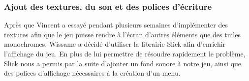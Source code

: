 \subsubsection{Ajout des textures, du son et des polices d'écriture}

Après que Vincent a essayé pendant plusieurs semaines d'implémenter des textures afin que le jeu puisse rendre à l'écran d'autres éléments que des tuiles monochromes, Wissame a décidé d'utiliser la librairie Slick afin d'enrichir l'affichage du jeu.
\ml
En plus de lui permettre de résoudre rapidement le problème, Slick nous a permis par la suite d'ajouter un fond sonore à notre jeu, ainsi que des polices d'affichage nécessaires à la création d'un menu.